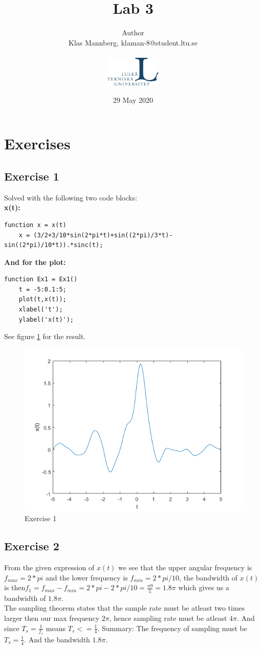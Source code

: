 \documentclass[a4paper]{article}
\title{Lab 3}
\author{
Author \\
{Klas Mannberg,   klaman-8@student.ltu.se
} \\ \\
\includegraphics[width=0.2\textwidth]{ltu_swe.jpg}}
\date{29 May 2020}
\begin{document}
\maketitle

\section{Exercises}
\subsection{Exercise 1}
Solved with the following two code blocks: \\
\textbf{x(t):}
\begin{lstlisting}
function x = x(t)
    x = (3/2+3/10*sin(2*pi*t)+sin((2*pi)/3*t)-sin((2*pi)/10*t)).*sinc(t);
\end{lstlisting}
\textbf{And for the plot:}
\begin{lstlisting}
function Ex1 = Ex1()
    t = -5:0.1:5;
    plot(t,x(t));
    xlabel('t');
    ylabel('x(t)');
\end{lstlisting}
See figure \ref{fig:1} for the result.
\begin{figure}
    \centering
    \includegraphics{1.png}
    \caption{Exercise 1}
    \label{fig:1}
\end{figure}
\subsection{Exercise 2}
From the given expression of $x(t)$ we see that the upper angular frequency is $f_{max} = 2*pi$ and the lower frequency is $f_{min} = 2*pi/10$, the bandwidth of $x(t)$ is then$f_1 = f_{max} - f_{min} = 2*pi-2*pi/10 = \frac{\pi9}{5} = 1.8\pi$ which gives us a bandwidth of $1.8\pi$. \\
The sampling theorem states that the sample rate must be atleast two times larger then our max frequency $2\pi$, hence sampling rate must be atleast $4\pi$. And since $T_s = \frac{1}{f_s}$ means $T_s <= \frac{1}{4}$.
Summary: The frequency of sampling must be $T_s = \frac{1}{4}$. And the bandwidth $1.8\pi$.
\end{document}
